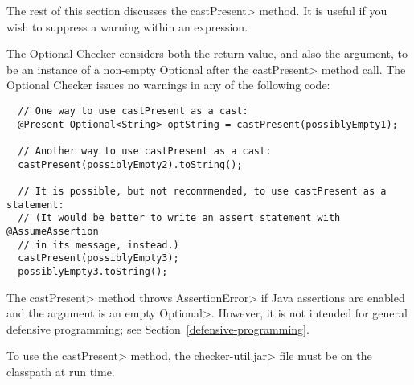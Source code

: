 The rest of this section discusses the \<castPresent> method.
It is useful if you wish to suppress a warning within an expression.

The Optional Checker considers both the return value, and also the
argument, to be an instance of a non-empty Optional after the \<castPresent>
method call.
The Optional Checker issues no warnings in any of the following
code:

\begin{Verbatim}
  // One way to use castPresent as a cast:
  @Present Optional<String> optString = castPresent(possiblyEmpty1);

  // Another way to use castPresent as a cast:
  castPresent(possiblyEmpty2).toString();

  // It is possible, but not recommmended, to use castPresent as a statement:
  // (It would be better to write an assert statement with @AssumeAssertion
  // in its message, instead.)
  castPresent(possiblyEmpty3);
  possiblyEmpty3.toString();
\end{Verbatim}

  The \<castPresent> method throws \<AssertionError> if Java assertions are
  enabled and the argument is an empty \<Optional>.
  However, it is not intended for general defensive programming; see
  Section~\ref{defensive-programming}.

  To use the \<castPresent> method, the \<checker-util.jar> file
  must be on the classpath at run time.

